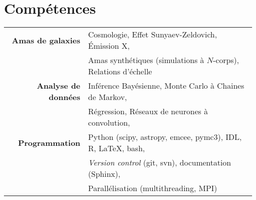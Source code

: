 \section{Compétences}\label{skills}

\begin{table}[H]
    {\def\arraystretch{1.}\tabcolsep=5pt
        \begin{tabular}{r l}

    \textbf{Amas de galaxies}
        & Cosmologie, Effet Sunyaev-Zeldovich, Émission X, \\
        & Amas synthétiques (simulations à $N$-corps), %
          Relations d'échelle \\[5pt]
    \textbf{Analyse de données}
        & Inférence Bayésienne, Monte Carlo à Chaines de Markov, \\
        & Régression, Réseaux de neurones à convolution, \\[5pt]
    \textbf{Programmation}
        & Python (scipy, astropy, emcee, pymc3), IDL, R, %
            \LaTeX, bash, \\
        & \textit{Version control} (git, svn), documentation (Sphinx), \\
        & Parallélisation (multithreading, MPI) \\

    \end{tabular}}
\end{table}
